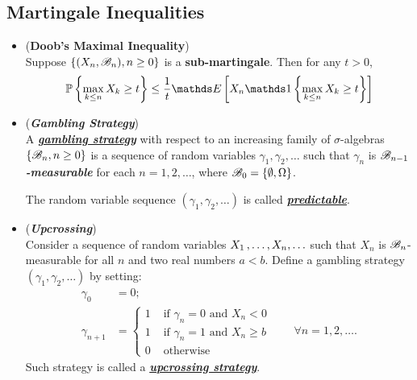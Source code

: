 \documentclass[11pt]{article}
\begin{document}
\subsection{Martingale Inequalities}
\begin{itemize}
\item \begin{theorem}(\textbf{Doob's Maximal Inequality}) \citep{billingsley2008probability}\\
Suppose $\left\{(X_n, {\mathscr B}_n), n \ge 0\right\}$ is a \textbf{sub-martingale}. Then for any $t >0$, 
\begin{align}
\bP\set{\max_{k \le n}X_k \ge t } \le \frac{1}{t}\E{}{X_n \ind{\max_{k \le n}X_k \ge t}} \label{ineqn: submartingale_maximal_inequality}
\end{align}
\end{theorem}

\item \begin{definition}(\textbf{\emph{Gambling Strategy}}) \\
A \underline{\emph{\textbf{gambling strategy}}} with respect to an increasing family of $\sigma$-algebras $\left\{{\mathscr B}_n, n \ge 0\right\}$ is a sequence of random variables $\gamma_1, \gamma_2, \ldots$ such that $\gamma_n$ is \emph{\textbf{${\mathscr B}_{n-1}$-measurable}} for each $n =1, 2, \ldots$, where ${\mathscr B}_0 = \left\{\emptyset, \Omega\right\}$.

The random variable sequence $(\gamma_1, \gamma_2, \ldots)$ is called \underline{\emph{\textbf{predictable}}}.
\end{definition}

\item \begin{definition}(\textbf{\emph{Upcrossing}}) \\
Consider a sequence of random variables $X_1 \,{,}\ldots{,}\, X_n, \ldots$ such that $X_n$ is ${\mathscr B}_n$-measurable for all $n$ and two real numbers $a < b$. Define a gambling strategy $(\gamma_1, \gamma_2, \ldots)$ by setting:
\begin{align*}
\gamma_0 &= 0;\\
\gamma_{n+1} &= \left\{\begin{array}{cc}
1 & \text{ if }\gamma_n = 0 \text{ and }X_n <0\\
1 & \text{ if }\gamma_n = 1 \text{ and }X_n  \ge b\\
0 &\text{ otherwise}
\end{array}
\right.  \qquad \forall n=1, 2, \ldots.
\end{align*} Such strategy is called a \underline{\emph{\textbf{upcrossing strategy}}}.
\end{definition}


\end{itemize}
\end{document}
